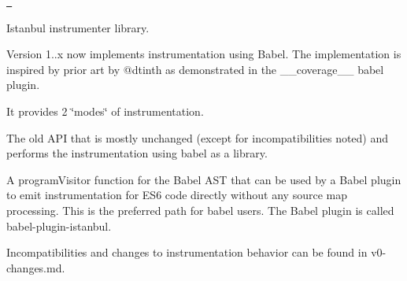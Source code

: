 \href{https://travis-ci.org/istanbuljs/istanbul-lib-instrument}{\texttt{ }}

Istanbul instrumenter library.

Version 1..\+x now implements instrumentation using {\ttfamily Babel}. The implementation is inspired by prior art by @dtinth as demonstrated in the {\ttfamily \+\_\+\+\_\+coverage\+\_\+\+\_\+} babel plugin.

It provides 2 \char`\"{}modes\char`\"{} of instrumentation.


\begin{DoxyItemize}
\item The old API that is mostly unchanged (except for incompatibilities noted) and performs the instrumentation using babel as a library.
\item A {\ttfamily program\+Visitor} function for the Babel AST that can be used by a Babel plugin to emit instrumentation for ES6 code directly without any source map processing. This is the preferred path for babel users. The Babel plugin is called {\ttfamily babel-\/plugin-\/istanbul}.
\end{DoxyItemize}

Incompatibilities and changes to instrumentation behavior can be found in v0-\/changes.md. 
